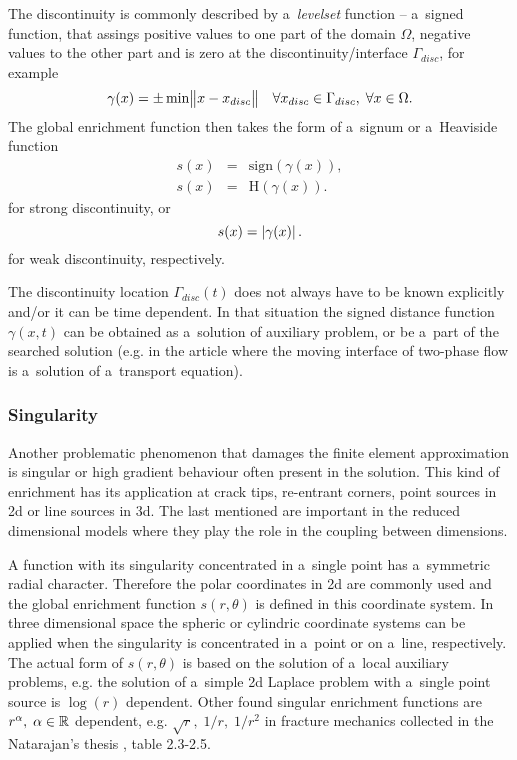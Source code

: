 The discontinuity is commonly described by a~\emph{levelset} function -- a~signed function,
that assings positive values to one part of the domain $\Omega$, negative values to the other part and is zero at the discontinuity/interface $\Gamma_{disc}$, for example
\[
    \gamma(x) = \pm \min \bigl\Vert x-x_{disc}\bigr\Vert \quad \forall x_{disc} \in \Gamma_{disc},\; \forall x \in \Omega.
\]
The global enrichment function then takes the form of a~signum or a~Heaviside function
\begin{eqnarray}
    s(x) &=& \textrm{sign}(\gamma(x)),\\
    s(x) &=& \textrm{H}(\gamma(x)).
\end{eqnarray}
for strong discontinuity, or
\begin{equation}
    s(x) = \left|\gamma(x)\right|.
\end{equation}
for weak discontinuity, respectively.

The discontinuity location $\Gamma_{disc}(t)$ does not always have to be known explicitly and/or it can be time dependent.
In that situation the signed distance function $\gamma(x,t)$ can be obtained as a~solution of auxiliary problem, or be a~part of
the searched solution (e.g. in the article \cite{sauerland_stable_2013}
where the moving interface of two-phase flow is a~solution of a~transport equation).


\subsubsection{Singularity}
Another problematic phenomenon that damages the finite element approximation is singular or high gradient behaviour often present in the solution.
This kind of enrichment has its application at crack tips, re-entrant corners, point sources in 2d or line sources in 3d.
The last mentioned are important in the reduced dimensional models where they play the role in the coupling between dimensions.

A function with its singularity concentrated in a~single point has a~symmetric radial character.
Therefore the polar coordinates in 2d are commonly used and the global enrichment function $s(r,\theta)$ is defined in this coordinate system.
In three dimensional space the spheric or cylindric coordinate systems can be applied when the singularity is concentrated in a~point or on a~line, respectively.
The actual form of $s(r,\theta)$ is based on the solution of a~local auxiliary problems, e.g. the solution of a~simple 2d Laplace problem with a~single point source 
is $\log(r)$ dependent. Other found singular enrichment functions are $r^\alpha,\;\alpha\in\mathbb{R}$ dependent,
e.g. $\sqrt{r},\;1/r,\; 1/r^2$ in fracture mechanics collected in the Natarajan's thesis \cite{natarajan_enriched_2011}, table 2.3-2.5.

